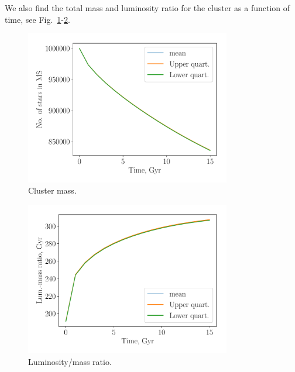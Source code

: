 \documentclass{article}
\begin{document}
We also find the total mass and luminosity ratio for the cluster as a function
of time, see Fig.~\ref{sm}-\ref{lm}.

\begin{figure}
\centering
\includegraphics[width=0.8\textwidth]{ms.pdf}
\caption{Cluster mass.}
\label{sm}
\end{figure}

\begin{figure}
\centering
\includegraphics[width=0.8\textwidth]{lm.pdf}
\caption{Luminosity/mass ratio.}
\label{lm}
\end{figure}
\end{document}
